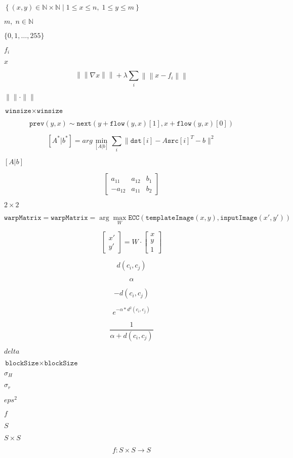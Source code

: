 \documentclass{article}
\begin{document}
$\left\{(x,y)\in\mathbb{N}\times\mathbb{N}\mid 1\leq x\leq n,\;1\leq y\leq m\right\}$
\pagebreak

$m,\;n\in\mathbb{N}$
\pagebreak

$\{0,1,\dots,255\}$
\pagebreak

$f_i$
\pagebreak

$x$
\pagebreak

\[\left\|\left\|\nabla x\right\|\right\| + \lambda\sum_i\left\|\left\|x-f_i\right\|\right\|\]
\pagebreak

$\|\|\cdot\|\|$
\pagebreak

$\texttt{winsize}\times\texttt{winsize}$
\pagebreak

\[\texttt{prev} (y,x) \sim \texttt{next} ( y + \texttt{flow} (y,x)[1], x + \texttt{flow} (y,x)[0])\]
\pagebreak

\[[A^*|b^*] = arg \min _{[A|b]} \sum _i \| \texttt{dst}[i] - A { \texttt{src}[i]}^T - b \| ^2\]
\pagebreak

$[A|b]$
\pagebreak

\[\begin{bmatrix} a_{11} & a_{12} & b_1 \\ -a_{12} & a_{11} & b_2 \end{bmatrix}\]
\pagebreak

$2\times 2$
\pagebreak

\[\texttt{warpMatrix} = \texttt{warpMatrix} = \arg\max_{W} \texttt{ECC}(\texttt{templateImage}(x,y),\texttt{inputImage}(x',y'))\]
\pagebreak

\[\begin{bmatrix} x' \\ y' \end{bmatrix} = W \cdot \begin{bmatrix} x \\ y \\ 1 \end{bmatrix}\]
\pagebreak

\[ d(c_i, c_j) \]
\pagebreak

\[ \alpha \]
\pagebreak

\[ -d(c_i, c_j) \]
\pagebreak

\[ e^{ -\alpha * d^2(c_i, c_j)} \]
\pagebreak

\[ \frac{1}{\alpha + d(c_i, c_j)} \]
\pagebreak

$ delta $
\pagebreak

$\texttt{blockSize} \times\texttt{blockSize}$
\pagebreak

${\sigma}_H$
\pagebreak

${\sigma}_r$
\pagebreak

${eps}^2$
\pagebreak

$ f $
\pagebreak

$ S $
\pagebreak

$ S \times S $
\pagebreak

\[ f: S \times S \to S \]
\pagebreak
\end{document}
